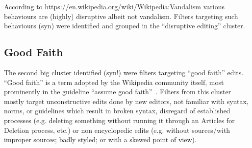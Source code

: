 According to https://en.wikipedia.org/wiki/Wikipedia:Vandalism various behaviours are (highly) disruptive albeit not vandalism.
Filters targeting such behaviours (syn) were identified and grouped in the ``disruptive editing'' cluster. %

\subsection{Good Faith}

The second big cluster identified (syn!) were filters targeting ``good faith'' edits.
``Good faith'' is a term adopted by the Wikipedia community itself, most prominently in the guideline ``assume good faith''~\cite{Wikipedia:GoodFaith}.
Filters from this cluster mostly target unconstructive edits done by new editors, not familiar with syntax, norms, or guidelines which result in broken syntax, disregard of established processes (e.g. deleting something without running it through an Articles for Deletion process, etc.) or non encyclopedic edits (e.g. without sources/with improper sources; badly styled; or with a skewed point of view).

